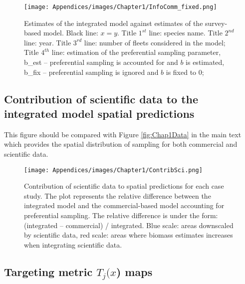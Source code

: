 \begin{figure}[H]
   \begin{center}
      \texttt{[image: Appendices/images/Chapter1/InfoComm\_fixed.png]}
   \end{center}
   \caption[Estimates of the integrated model against estimates of the survey-based model.]
   {Estimates of the integrated model against estimates of the survey-based model. Black line: \(x=y\). Title \(1^{st}\) line: species name. Title \(2^{nd}\) line: year. Title \(3^{rd}\) line: number of fleets considered in the model; Title \(4^{th}\) line: estimation of the preferential sampling parameter, b_est – preferential sampling is accounted for and \(b\) is estimated, b_fix – preferential sampling is ignored and \(b\) is fixed to 0;}
   \label{fig:InfoCommPar}
\end{figure}

\newpage

\subsection{Contribution of scientific data to the integrated model spatial predictions}\label{appendix:ContribSci}

This figure should be compared with Figure    \ref{fig:Chap1Data} in the main text which provides the spatial distribution of sampling for both commercial and scientific data.

\begin{figure}[H]
   \begin{center}
      \texttt{[image: Appendices/images/Chapter1/ContribSci.png]}
   \end{center}
   \caption[Contribution of scientific data to spatial predictions for each case study.]
   {Contribution of scientific data to spatial predictions for each case study. The plot represents the relative difference between the integrated model and the commercial-based model accounting for preferential sampling. The relative difference is under the form: (integrated – commercial) / integrated. Blue scale: areas downscaled by scientific data, red scale: areas where biomass estimates increases when integrating scientific data.}
   \label{fig:ContribSci}
\end{figure}

\newpage

\subsection{Targeting metric \(T_j (x\)) maps}\label{appendix:TargMetr}

